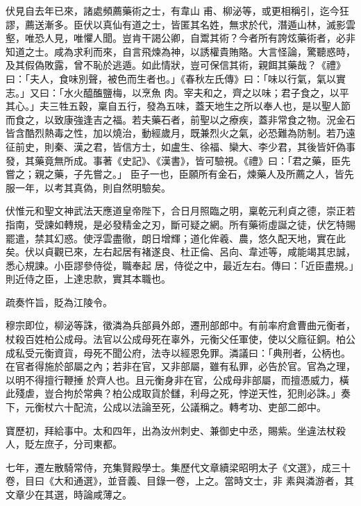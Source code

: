 \begin{pinyinscope}
 伏見自去年已來，諸處頻薦藥術之士，有韋山
 甫、柳泌等，或更相稱引，迄今狂謬，薦送漸多。臣伏以真仙有道之士，皆匿其名姓，無求於代，潛遁山林，滅影雲壑，唯恐人見，唯懼人聞。豈肯干謁公卿，自鬻其術？今者所有誇炫藥術者，必非知道之士。咸為求利而來，自言飛煉為神，以誘權貴賄賂。大言怪論，驚聽惑時，及其假偽敗露，曾不恥於逃遁。如此情狀，豈可保信其術，親餌其藥哉？《禮》曰：「夫人，食味別聲，被色而生者也。」《春秋左氏傳》曰：「味以行氣，氣以實志。」又曰：「水火醯醢鹽梅，以烹魚
 肉。宰夫和之，齊之以味；君子食之，以平其心。」夫三牲五穀，稟自五行，發為五味，蓋天地生之所以奉人也，是以聖人節而食之，以致康強逢吉之福。若夫藥石者，前聖以之療疾，蓋非常食之物。況金石皆含酷烈熱毒之性，加以燒治，動經歲月，既兼烈火之氣，必恐難為防制。若乃遠征前史，則秦、漢之君，皆信方士，如盧生、徐福、欒大、李少君，其後皆奸偽事發，其藥竟無所成。事著《史記》、《漢書》，皆可驗視。《禮》曰：「君之藥，臣先嘗之；親之藥，子先嘗之。」
 臣子一也，臣願所有金石，煉藥人及所薦之人，皆先服一年，以考其真偽，則自然明驗矣。



 伏惟元和聖文神武法天應道皇帝陛下，合日月照臨之明，稟乾元利貞之德，崇正若指南，受諫如轉規，是必發精金之刃，斷可疑之網。所有藥術虛誕之徒，伏乞特賜罷遣，禁其幻惑。使浮雲盡徹，朗日增輝；道化侔羲、農，悠久配天地，實在此矣。伏以貞觀已來，左右起居有褚遂良、杜正倫、呂向、韋述等，咸能竭其忠誠，悉心規諫。小臣謬參侍從，職奉起
 居，侍從之中，最近左右。傳曰：「近臣盡規。」則近侍之臣，上達忠款，實其本職也。



 疏奏忤旨，貶為江陵令。



 穆宗即位，柳泌等誅，徵潾為兵部員外郎，遷刑部郎中。有前率府倉曹曲元衡者，杖殺百姓柏公成母。法官以公成母死在辜外，元衡父任軍使，使以父廕征銅。柏公成私受元衡資貨，母死不聞公府，法寺以經恩免罪。潾議曰：「典刑者，公柄也。在官者得施於部屬之內；若非在官，又非部屬，雖有私罪，必告於官。官為之理，以明不得擅行鞭捶
 於齊人也。且元衡身非在官，公成母非部屬，而擅憑威力，橫此殘虐，豈合拘於常典？柏公成取貨於讎，利母之死，悖逆天性，犯則必誅。」奏下，元衡杖六十配流，公成以法論至死，公議稱之。轉考功、吏部二郎中。



 寶歷初，拜給事中。太和四年，出為汝州刺史、兼御史中丞，賜紫。坐違法杖殺人，貶左庶子，分司東都。



 七年，遷左散騎常侍，充集賢殿學士。集歷代文章續梁昭明太子《文選》，成三十卷，目曰《大和通選》，並音義、目錄一卷，上之。當時文士，非
 素與潾游者，其文章少在其選，時論咸薄之。




\end{pinyinscope}
